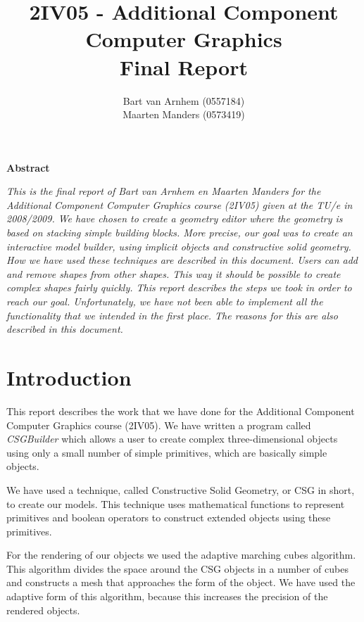 \documentclass[a4wide,10pt,twocolumn]{article}
\title{2IV05 - Additional Component Computer Graphics \\ Final Report}
\author{Bart van Arnhem (0557184) \\ Maarten Manders (0573419)}
\begin{document}
\maketitle
\thispagestyle{empty}

\onecolumn

\tableofcontents
\setcounter{page}{1}

\twocolumn

\begin{center}
    \textbf{\large Abstract}
\end{center}
{
\fontsize{8}{9}\selectfont
\noindent\textit{
    This is the final report of Bart van Arnhem en Maarten Manders for the Additional Component Computer Graphics course (2IV05) given at the TU/e in 2008/2009. We have chosen to create a geometry editor where the geometry is based on stacking simple building blocks. More precise, our goal was to create an interactive model builder, using implicit objects and constructive solid geometry. How we have used these techniques are described in this document. Users can add and remove shapes from other shapes. This way it should be possible to create complex shapes fairly quickly. This report describes the steps we took in order to reach our goal. Unfortunately, we have not been able to implement all the functionality that we intended in the first place. The reasons for this are also described in this document.}
}

\section{Introduction}
This report describes the work that we have done for the Additional Component Computer Graphics course (2IV05). We have written a program called \emph{CSGBuilder} which allows a user to create complex three-dimensional objects using only a small number of simple primitives, which are basically simple objects.

We have used a technique, called Constructive Solid Geometry, or CSG in short, to create our models. This technique uses mathematical functions to represent primitives and boolean operators to construct extended objects using these primitives.

For the rendering of our objects we used the adaptive marching cubes algorithm. This algorithm divides the space around the CSG objects in a number of cubes and constructs a mesh that approaches the form of the object. We have used the adaptive form of this algorithm, because this increases the precision of the rendered objects.
\end{document}
